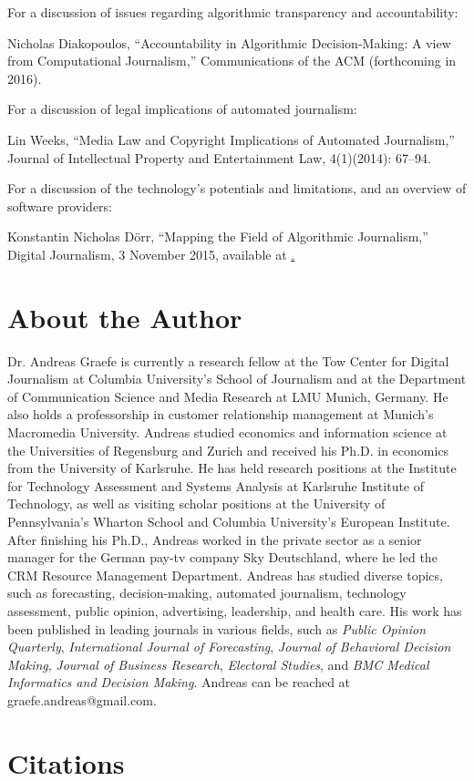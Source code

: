 \documentclass[notoc, symmetric, nobib, nols]{towcenter-guideto-book}
\newcommand{\blankpage}{\newpage\hbox{}\thispagestyle{empty}\newpage}
\begin{document}
For a discussion of issues regarding algorithmic transparency and accountability:

Nicholas Diakopoulos, ``Accountability in Algorithmic Decision-Making: A view from Computational Journalism,'' Communications of the ACM (forthcoming in 2016).   

For a discussion of legal implications of automated journalism:

Lin Weeks, ``Media Law and Copyright Implications of Automated Journalism,'' Journal of Intellectual Property and Entertainment Law, 4(1)(2014): 67--94.

For a discussion of the technology's potentials and limitations, and an overview of software providers:

Konstantin Nicholas Dörr, ``Mapping the Field of Algorithmic Journalism,'' Digital Journalism, 3 November 2015, available at \href{http://www.tandfonline.com/doi/abs/10.1080/21670811.2015.1096748?journalCode=rdij20}.

\chapter{About the Author}

Dr. Andreas Graefe is currently a research fellow at the Tow Center for Digital Journalism at Columbia University's School of Journalism and at the Department of Communication Science and Media Research at LMU Munich, Germany. He also holds a professorship in customer relationship management at Munich's Macromedia University. Andreas studied economics and information science at the Universities of Regensburg and Zurich and received his Ph.D. in economics from the University of Karlsruhe. He has held research positions at the Institute for Technology Assessment and Systems Analysis at Karlsruhe Institute of Technology, as well as visiting scholar positions at the University of Pennsylvania's Wharton School and Columbia University's European Institute. After finishing his Ph.D., Andreas worked in the private sector as a senior manager for the German pay-tv company Sky Deutschland, where he led the CRM Resource Management Department. Andreas has studied diverse topics, such as forecasting, decision-making, automated journalism, technology assessment, public opinion, advertising, leadership, and health care. His work has been published in leading journals in various fields, such as \textit{Public Opinion Quarterly}, \textit{International Journal of Forecasting}, \textit{Journal of Behavioral Decision Making}, \textit{Journal of Business Research}, \textit{Electoral Studies}, and \textit{BMC Medical Informatics and Decision Making}. Andreas can be reached at graefe.andreas@gmail.com.


\chapter{Citations}
\blankpage
\theendnotes
\end{document}
